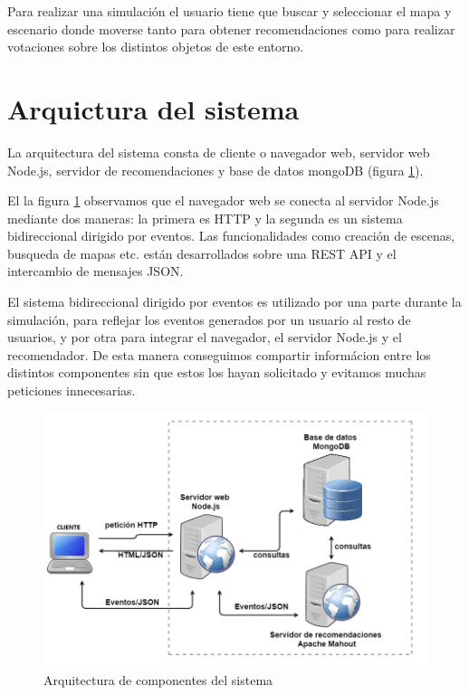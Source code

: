 Para realizar una simulación el usuario tiene que buscar y seleccionar el mapa y escenario donde moverse tanto para obtener recomendaciones como para realizar votaciones sobre los distintos objetos de este entorno.

\section{Arquictura del sistema}
\thispagestyle{empty}

La arquitectura del sistema consta de cliente o navegador web, servidor web Node.js, servidor de recomendaciones y base de datos mongoDB (figura \ref{arquitecturaComponentes}).

El la figura \ref{arquitecturaComponentes} observamos que el navegador web se conecta al servidor Node.js mediante dos maneras: la primera es HTTP y la segunda es un sistema bidireccional dirigido por eventos. Las funcionalidades como creación de escenas, busqueda de mapas etc. están desarrollados sobre una REST API y el intercambio de mensajes JSON.

El sistema bidireccional dirigido por eventos es utilizado por una parte durante la simulación, para reflejar los eventos generados por un usuario al resto de usuarios, y por otra para integrar el navegador, el servidor Node.js y el recomendador. De esta manera conseguimos compartir informácion entre los distintos componentes sin que estos los hayan solicitado y evitamos muchas peticiones innecesarias.

\begin{figure}[H]
\centering\includegraphics[scale=0.4]{imagenes/arquitectura-componentes.png}
\caption{Arquitectura de componentes del sistema}
\label{arquitecturaComponentes}
\end{figure}


